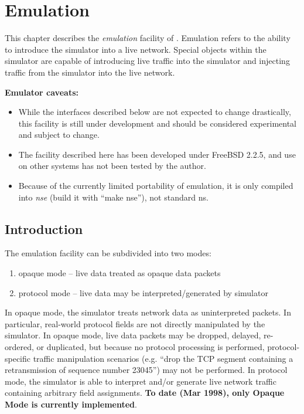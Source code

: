 \chapter{Emulation}
\label{sec:emulation}

This chapter describes the {\em emulation} facility
of \ns.
Emulation refers to the ability to introduce the
simulator into a live network.
Special objects within the simulator are capable
of introducing live traffic into the simulator and
injecting traffic from the simulator into the
live network.

\textbf{Emulator caveats:}
\begin{itemize}
\item While the interfaces described below
are not expected to change drastically,
this facility is still under development and
should be considered experimental and subject to change.

\item The facility described here has been
developed under FreeBSD 2.2.5, and use on other systems
has not been tested by the author.

\item Because of the currently limited portability of emulation, it
	 is only compiled into \emph{nse}
	(build it with ``make nse''),
	not standard ns.
\end{itemize}

\section{Introduction}

The emulation facility can be subdivided into
two modes:
\begin{enumerate}
\item {\sf opaque mode} -- live data treated as opaque data packets
\item {\sf protocol mode} -- live data may be interpreted/generated by simulator
\end{enumerate}
In opaque mode, the simulator
treats network data as uninterpreted packets.
In particular, real-world protocol fields
are not directly manipulated by the simulator.
In opaque mode, live data packets may be dropped, delayed, re-ordered, or
duplicated, but because no protocol processing is performed,
protocol-specific traffic manipulation scenarios (e.g. ``drop the TCP segment
containing a retransmission of sequence number 23045'') may not be performed.
In protocol mode, the simulator is able to interpret and/or generate
live network traffic containing arbitrary field assignments.
{\bf To date (Mar 1998), only Opaque Mode is currently implemented}.

